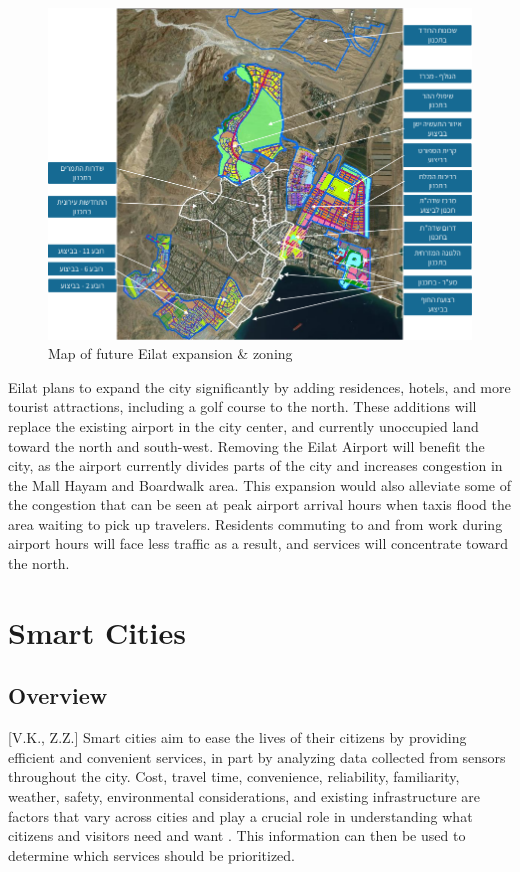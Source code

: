 \documentclass[12pt]{article}                       %
\begin{document}
\begin{figure}[H]
    \centering
    \includegraphics[width=12cm]{images/eilat_zoning_future.png}
    \caption{Map of future Eilat expansion \& zoning}
    \label{img:eilat_expansion}
\end{figure}

Eilat plans to expand the city significantly by adding residences, hotels, and more tourist attractions, including a golf course to the north. These additions will replace the existing airport in the city center, and currently unoccupied land toward the north and south-west. Removing the Eilat Airport will benefit the city, as the airport currently divides parts of the city and increases congestion in the Mall Hayam and Boardwalk area. This expansion would also alleviate some of the congestion that can be seen at peak airport arrival hours when taxis flood the area waiting to pick up travelers. Residents commuting to and from work during airport hours will face less traffic as a result, and services will concentrate toward the north. 

\newpage
\section{Smart Cities}
\subsection{Overview}[V.K., Z.Z.]
Smart cities aim  to ease the lives of their citizens by providing efficient and convenient services, in part by analyzing data collected from sensors throughout the city. Cost, travel time, convenience, reliability, familiarity, weather, safety, environmental considerations, and existing infrastructure are factors that vary across cities and play a crucial role in understanding what citizens and visitors need and want \cite{2016LiveChallenge}. This information can then be used to determine which services should be prioritized.
\end{document}
